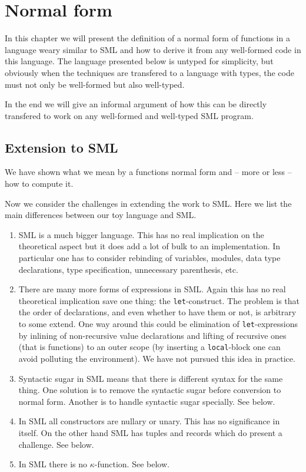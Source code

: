 \chapter{Normal form}\label{chap:normal-form}
In this chapter we will present the definition of a normal form of functions in
a language weary similar to SML and how to derive it from any well-formed code
in this language. The language presented below is untyped for simplicity, but
obviously when the techniques are transfered to a language with types, the code
must not only be well-formed but also well-typed.

In the end we will give an informal argument of how this can be directly
transfered to work on any well-formed and well-typed SML program.



\section{Extension to SML}

We have shown what we mean by a functions normal form and -- more or less -- how
to compute it.

Now we consider the challenges in extending the work to SML. Here we list the
main differences between our toy language and SML.

\begin{enumerate}
\item SML is a much bigger language. This has no real implication on the
  theoretical aspect but it does add a lot of bulk to an implementation. In
  particular one has to consider rebinding of variables, modules, data type
  declarations, type specification, unnecessary parenthesis, etc.
\item There are many more forms of expressions in SML. Again this has no real
  theoretical implication save one thing: the \texttt{let}-construct. The
  problem is that the order of declarations, and even whether to have them or
  not, is arbitrary to some extend. One way around this could be elimination of
  \texttt{let}-expressions by inlining of non-recursive value declarations and
  lifting of recursive ones (that is functions) to an outer scope (by inserting
  a \texttt{local}-block one can avoid polluting the environment). We have not
  pursued this idea in practice.
\item Syntactic sugar in SML means that there is different syntax for the same
  thing. One solution is to remove the syntactic sugar before conversion to
  normal form. Another is to handle syntactic sugar specially. See
   below.
\item In SML all constructors are nullary or unary. This has no significance in
  itself. On the other hand SML has tuples and records which do present a
  challenge. See  below.
\item In SML there is no $\kappa$-function. See 
  below.
\end{enumerate}

